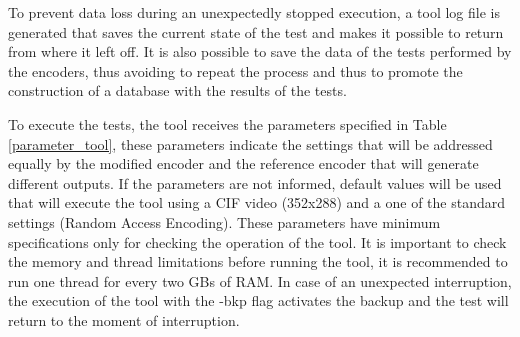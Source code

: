 \documentclass[journal]{IEEEtran}
\begin{document}
To prevent data loss during an unexpectedly stopped execution, a tool log file is generated that saves the current state of the test and makes it possible to return from where it left off. It is also possible to save the data of the tests performed by the encoders, thus avoiding to repeat the process and thus to promote the construction of a database with the results of the tests.

To execute the tests, the tool receives the parameters specified in Table \ref{parameter_tool}, these parameters indicate the settings that will be addressed equally by the modified encoder and the reference encoder that will generate different outputs. If the parameters are not informed, default values will be used that will execute the tool using a CIF video (352x288) and a one of the standard settings (Random Access Encoding). These parameters have minimum specifications only for checking the operation of the tool. It is important to check the memory and thread limitations before running the tool, it is recommended to run one thread for every two GBs of RAM. In case of an unexpected interruption, the execution of the tool with the -bkp flag activates the backup and the test will return to the moment of interruption.

\FloatBarrier
\end{document}
